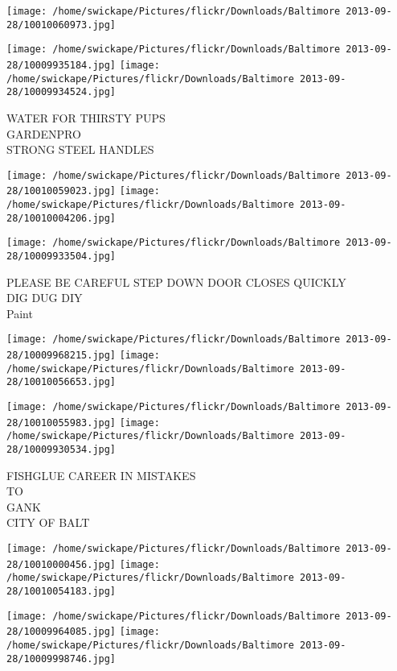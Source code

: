 \documentclass[10pt,letterpaper]{article}
\begin{document}
\texttt{[image: /home/swickape/Pictures/flickr/Downloads/Baltimore 2013-09-28/10010060973.jpg]}

\vspace{0.25in}
\texttt{[image: /home/swickape/Pictures/flickr/Downloads/Baltimore 2013-09-28/10009935184.jpg]}
\texttt{[image: /home/swickape/Pictures/flickr/Downloads/Baltimore 2013-09-28/10009934524.jpg]}

WATER FOR THIRSTY PUPS\\
GARDENPRO\\
STRONG STEEL HANDLES\\
\pagebreak

\texttt{[image: /home/swickape/Pictures/flickr/Downloads/Baltimore 2013-09-28/10010059023.jpg]}
\texttt{[image: /home/swickape/Pictures/flickr/Downloads/Baltimore 2013-09-28/10010004206.jpg]}

\vspace{0.25in}
\texttt{[image: /home/swickape/Pictures/flickr/Downloads/Baltimore 2013-09-28/10009933504.jpg]}

PLEASE BE CAREFUL STEP DOWN DOOR CLOSES QUICKLY\\
DIG DUG DIY\\
Paint\\
\pagebreak

\texttt{[image: /home/swickape/Pictures/flickr/Downloads/Baltimore 2013-09-28/10009968215.jpg]}
\texttt{[image: /home/swickape/Pictures/flickr/Downloads/Baltimore 2013-09-28/10010056653.jpg]}

\texttt{[image: /home/swickape/Pictures/flickr/Downloads/Baltimore 2013-09-28/10010055983.jpg]}
\texttt{[image: /home/swickape/Pictures/flickr/Downloads/Baltimore 2013-09-28/10009930534.jpg]}

FISHGLUE CAREER IN MISTAKES\\
TO\\
GANK\\
CITY OF BALT\\
\pagebreak

\texttt{[image: /home/swickape/Pictures/flickr/Downloads/Baltimore 2013-09-28/10010000456.jpg]}
\texttt{[image: /home/swickape/Pictures/flickr/Downloads/Baltimore 2013-09-28/10010054183.jpg]}

\texttt{[image: /home/swickape/Pictures/flickr/Downloads/Baltimore 2013-09-28/10009964085.jpg]}
\texttt{[image: /home/swickape/Pictures/flickr/Downloads/Baltimore 2013-09-28/10009998746.jpg]}
\end{document}
